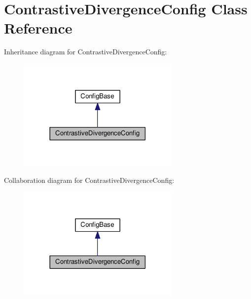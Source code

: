 \hypertarget{class_contrastive_divergence_config}{}\section{Contrastive\+Divergence\+Config Class Reference}
\label{class_contrastive_divergence_config}


Inheritance diagram for Contrastive\+Divergence\+Config\+:\nopagebreak
\begin{figure}[H]
\begin{center}
\leavevmode
\includegraphics[width=225pt]{class_contrastive_divergence_config__inherit__graph}
\end{center}
\end{figure}


Collaboration diagram for Contrastive\+Divergence\+Config\+:\nopagebreak
\begin{figure}[H]
\begin{center}
\leavevmode
\includegraphics[width=225pt]{class_contrastive_divergence_config__coll__graph}
\end{center}
\end{figure}
